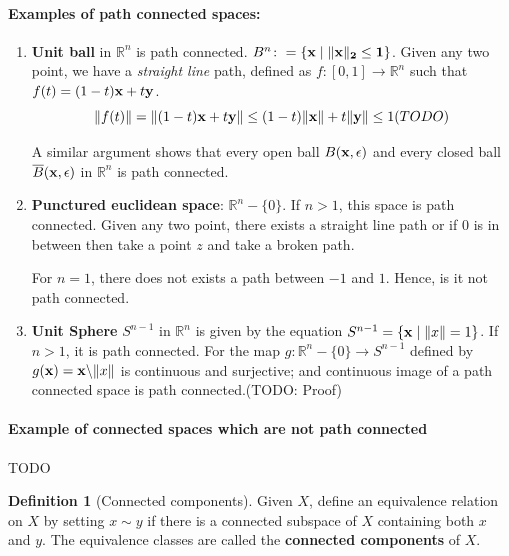 \documentclass[12pt,reqno]{amsart}
\theoremstyle{plain}
\theoremstyle{definition}
\newtheorem{defn}{Definition}
\newcommand{\bb}[1]{\mathbb{#1}}
\begin{document}
\paragraph{{\bf Examples of path connected spaces:}}
\begin{enumerate}
    \item {\bf Unit ball} in $\bb R^n$ is path connected. $B^n \colon=\{\bf{x} \mid \|x\|_2 \leq 1\}$. Given any two point, we have a {\it straight line} path, defined as $f\colon[0,1] \to \bb R^n$ such that $f(t) = (1-t){\bf x} + t{\bf y}$.
    $$ \|f(t)\| = \|(1-t){\bf x} + t{\bf y}\| \leq (1-t)\|{\bf x}\| + t\|{\bf y}\| \leq 1(TODO)$$

    A similar argument shows that every open ball $B({\bf x},\epsilon)$ and every closed ball $\overline{B}({\bf x},\epsilon)$ in $\bb R^n$ is path connected.
    \item {\bf Punctured euclidean space}: $\bb R^n - \{0\}$. If $n > 1$, this space is path connected. Given any two point, there exists a straight line path or if $0$ is in between then take a point $z$ and take a broken path.
    
    For $n = 1$, there does not exists a path between $-1$ and $1$. Hence, is it not path connected.
    \item {\bf Unit Sphere} $S^{n-1}$ in $\bb R^n$ is given by the equation $ S^{n-1} = \{{\bf x} \mid \|x\| = 1\}$. If $n > 1$, it is path connected. For the map $g \colon \bb R^n - \{0\} \to S^{n-1}$ defined by $g({\bf x}) = {\bf x}\backslash\|x\|$ is continuous and surjective; and continuous image of a path connected space is path connected.(TODO: Proof)
\end{enumerate}
\paragraph{{\bf Example of connected spaces which are not path connected}}
TODO

\begin{defn}[Connected components]
    Given $X$, define an equivalence relation on $X$ by setting $x \sim y$ if there is a connected subspace of $X$ containing both $x$ and $y$. The equivalence classes are called the {\bf connected components} of $X$.
\end{defn}
\end{document}
